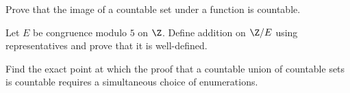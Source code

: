 \begin{exercise}
\label{ex:set-prerequisites-01}
Prove that the image of a countable set under a function is countable.
\end{exercise}

\begin{exercise}
\label{ex:set-prerequisites-02}
Let \(E\) be congruence modulo \(5\) on \(\Z\).  Define addition on
\(\Z/E\) using representatives and prove that it is well-defined.
\end{exercise}

\begin{exercise}
\label{ex:set-prerequisites-03}
Find the exact point at which the proof that a countable union of countable sets
is countable requires a simultaneous choice of enumerations.
\end{exercise}


